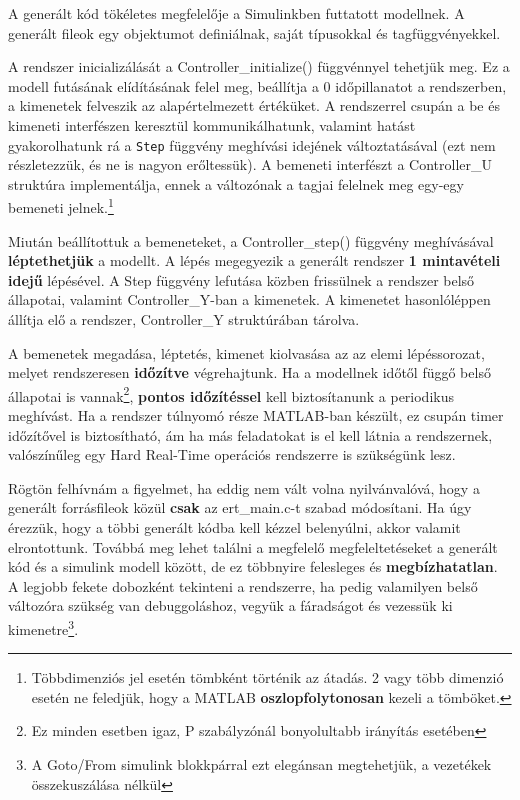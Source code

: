 A generált kód tökéletes megfelelője a Simulinkben futtatott modellnek. A generált fileok egy objektumot definiálnak, saját típusokkal és tagfüggvényekkel.

A rendszer inicializálását a Controller\_initialize() függvénnyel tehetjük meg. Ez a modell futásának elídításának felel meg, beállítja a 0 időpillanatot a rendszerben, a kimenetek felveszik az alapértelmezett értéküket.
A rendszerrel csupán a be és kimeneti interfészen keresztül kommunikálhatunk, valamint hatást gyakorolhatunk rá a \verb!Step! függvény meghívási idejének változtatásával (ezt nem részletezzük, és ne is nagyon erőltessük).
A bemeneti interfészt a Controller\_U struktúra implementálja, ennek a változónak a tagjai felelnek meg egy-egy bemeneti jelnek.\footnote{Többdimenziós jel esetén tömbként történik az átadás. 2 vagy több dimenzió esetén ne feledjük, hogy a MATLAB \textbf{oszlopfolytonosan} kezeli a tömböket.}

Miután beállítottuk a bemeneteket, a Controller\_step() függvény meghívásával \textbf{léptethetjük} a modellt. A lépés megegyezik a generált rendszer \textbf{1 mintavételi idejű} lépésével. A Step függvény lefutása közben frissülnek a rendszer belső állapotai, valamint Controller\_Y-ban a kimenetek. A kimenetet hasonlóléppen állítja elő a rendszer, Controller\_Y struktúrában tárolva.

A bemenetek megadása, léptetés, kimenet kiolvasása az az elemi lépéssorozat, melyet rendszeresen \textbf{időzítve} végrehajtunk. Ha a modellnek időtől függő belső állapotai is vannak\footnote{Ez minden esetben igaz, P szabályzónál bonyolultabb irányítás esetében}, \textbf{pontos időzítéssel} kell biztosítanunk a periodikus meghívást. Ha a rendszer túlnyomó része MATLAB-ban készült, ez csupán timer időzítővel is biztosítható, ám ha más feladatokat is el kell látnia a rendszernek, valószínűleg egy Hard Real-Time operációs rendszerre is szükségünk lesz.

Rögtön felhívnám a figyelmet, ha eddig nem vált volna nyilvánvalóvá, hogy a generált forrásfileok közül \textbf{csak} az ert\_main.c-t szabad módosítani. Ha úgy érezzük, hogy a többi generált kódba kell kézzel belenyúlni, akkor valamit elrontottunk. Továbbá meg lehet találni a megfelelő megfeleltetéseket a generált kód és a simulink modell között, de ez többnyire felesleges és \textbf{megbízhatatlan}. A legjobb fekete dobozként tekinteni a rendszerre, ha pedig valamilyen belső változóra szükség van debuggoláshoz, vegyük a fáradságot és vezessük ki kimenetre\footnote{A Goto/From simulink blokkpárral ezt elegánsan megtehetjük, a vezetékek összekuszálása nélkül}.

